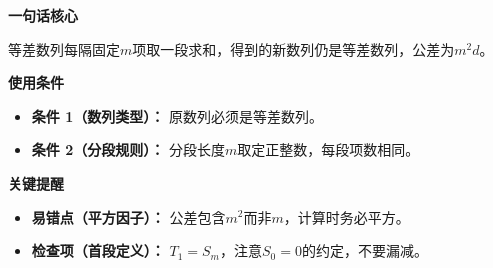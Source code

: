 \begin{summarybox}

	\textbf{\textcolor{CSummary}{一句话核心}}

	等差数列每隔固定$m$项取一段求和，得到的新数列仍是等差数列，公差为$m^2 d$。

	\medskip
	\textbf{\textcolor{CSummary}{使用条件}}
	\begin{itemize}[leftmargin=*, itemsep=0.5em, topsep=0.4em]
		\item \textbf{条件 1（数列类型）：} 原数列必须是等差数列。
		\item \textbf{条件 2（分段规则）：} 分段长度$m$取定正整数，每段项数相同。
	\end{itemize}

	\medskip
	\textbf{\textcolor{CSummary}{关键提醒}}
	\begin{itemize}[leftmargin=*, itemsep=0.5em, topsep=0.4em]
		\item \textbf{易错点（平方因子）：} 公差包含$m^2$而非$m$，计算时务必平方。
		\item \textbf{检查项（首段定义）：} $T_1=S_m$，注意$S_0=0$的约定，不要漏减。
	\end{itemize}

\end{summarybox}
